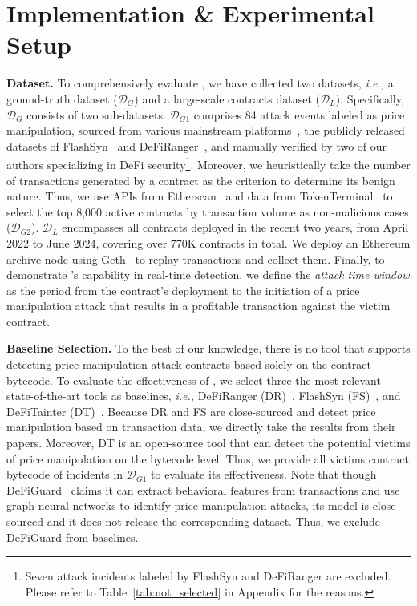 \section{Implementation \& Experimental Setup}
\label{sec:evaluation}


\noindent
\textbf{Dataset.}
To comprehensively evaluate {\tool}, we have collected two datasets, \textit{i.e.,} a ground-truth dataset ($\mathcal{D}_{G}$) and a large-scale contracts dataset ($\mathcal{D}_L$).
Specifically, $\mathcal{D}_G$ consists of two sub-datasets.
$\mathcal{D}_{G1}$ comprises 84 attack events labeled as price manipulation, sourced from various mainstream platforms~\cite{Defihacklab, slowmist, rekt}, the publicly released datasets of FlashSyn~\cite{chen2024flashsyn} and DeFiRanger~\cite{wu2023defiranger}, and manually verified by two of our authors specializing in DeFi security\footnote{Seven attack incidents labeled by FlashSyn and DeFiRanger are excluded. Please refer to Table~\ref{tab:not_selected} in Appendix for the reasons.}.
Moreover, we heuristically take the number of transactions generated by a contract as the criterion to determine its benign nature. Thus, we use APIs from Etherscan~\cite{EthApi} and data from TokenTerminal~\cite{tokenter} to select the top 8,000 active contracts by transaction volume as non-malicious cases ($\mathcal{D}_{G2}$).
$\mathcal{D}_L$ encompasses all contracts deployed in the recent two years, from April 2022 to June 2024, covering over 770K contracts in total.
We deploy an Ethereum archive node using Geth~\cite{geth} to replay transactions and collect them.
Finally, to demonstrate {\tool}'s capability in real-time detection, we define the \textit{attack time window} as the period from the contract's deployment to the initiation of a price manipulation attack that results in a profitable transaction against the victim contract.


\noindent \textbf{Baseline Selection.}
To the best of our knowledge, there is no tool that supports detecting price manipulation attack contracts based solely on the contract bytecode.
To evaluate the effectiveness of {\tool}, we select three the most relevant state-of-the-art tools as baselines, \textit{i.e.,} DeFiRanger (DR)~\cite{wu2023defiranger}, FlashSyn (FS)~\cite{chen2024flashsyn}, and DeFiTainter (DT)~\cite{kong2023defitainter}.
Because DR and FS are close-sourced and detect price manipulation based on transaction data, we directly take the results from their papers.
Moreover, DT is an open-source tool that can detect the potential victims of price manipulation on the bytecode level. Thus, we provide all victims contract bytecode of incidents in $\mathcal{D}_{G1}$ to evaluate its effectiveness.
Note that though DeFiGuard~\cite{wang2024defiguard} claims it can extract behavioral features from transactions and use graph neural networks to identify price manipulation attacks, its model is close-sourced and it does not release the corresponding dataset. Thus, we exclude DeFiGuard from baselines.



